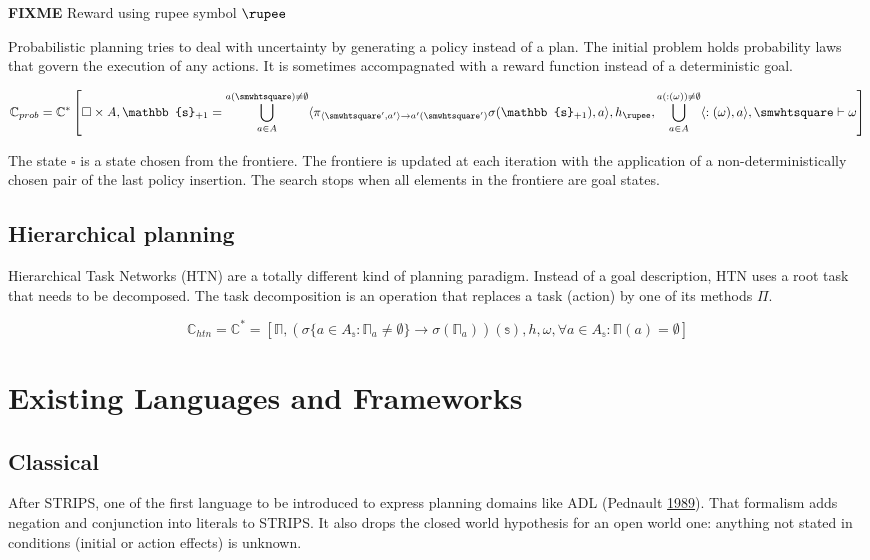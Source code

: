 \documentclass[11pt,a4paper,twoside,openright,titlepage,numbers=noenddot,headinclude,cleardoublepage=empty,openany]{scrreprt}
\theoremstyle{plain}
\theoremstyle{definition}
\theoremstyle{remark}
\newcommand{\bb}{\mathbb}
\begin{document}
\textbf{FIXME} Reward using rupee symbol \(\rupee\)

Probabilistic planning tries to deal with uncertainty by generating a
policy instead of a plan. The initial problem holds probability laws
that govern the execution of any actions. It is sometimes accompagnated
with a reward function instead of a deterministic goal.

\[\bb{C}_{prob} = \bb{C}^* \left[ \square \times A, \bb{s}_{+1} = \bigcup_{a \in A}^{a(\smwhtsquare) \neq \emptyset} \langle \pi_{\langle \smwhtsquare', a' \rangle \to a'(\smwhtsquare')}\sigma(\bb{s}_{+1}), a \rangle, h_\rupee, \bigcup_{a \in A}^{a(:(\omega)) \neq \emptyset} \langle :(\omega), a \rangle , \smwhtsquare \vdash \omega \right]\]

The state \(\smwhtsquare\) is a state chosen from the frontiere. The
frontiere is updated at each iteration with the application of a
non-deterministically chosen pair of the last policy insertion. The
search stops when all elements in the frontiere are goal states.

\hypertarget{hierarchical-planning}{%
\subsection{Hierarchical planning}\label{hierarchical-planning}}

Hierarchical Task Networks (HTN) are a totally different kind of
planning paradigm. Instead of a goal description, HTN uses a root task
that needs to be decomposed. The task decomposition is an operation that
replaces a task (action) by one of its methods \(\Pi\).

\[\bb{C}_{htn} = \bb{C}^* = \left [ \bb{\Pi}, \left(\sigma\{a\in A_{\bb{s}} : \bb{\Pi}_a \neq \emptyset\} \to\sigma(\bb{\Pi}_a)\right)(\bb{s}), h, \omega, \forall a \in A_{\bb{s}} : \bb{\Pi}(a) = \emptyset \right ]\]

\hypertarget{existing-languages-and-frameworks}{%
\section{Existing Languages and
Frameworks}\label{existing-languages-and-frameworks}}

\hypertarget{classical}{%
\subsection{Classical}\label{classical}}

After STRIPS, one of the first language to be introduced to express
planning domains like ADL (Pednault
\protect\hyperlink{ref-pednault_adl_1989}{1989}). That formalism adds
negation and conjunction into literals to STRIPS. It also drops the
closed world hypothesis for an open world one: anything not stated in
conditions (initial or action effects) is unknown.
\end{document}

